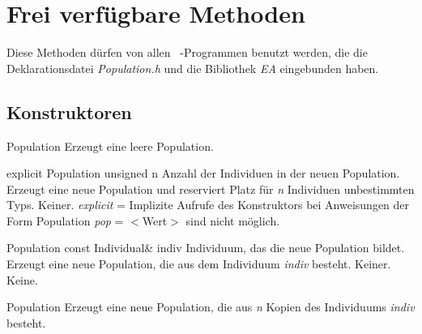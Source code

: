 \documentclass{report}
\begin{document}
\section{Frei verf\"ugbare Methoden}
Diese Methoden d\"urfen von allen \cpp\ -Programmen benutzt werden, die
die Deklarationsdatei {\em Population.h} und
die Bibliothek {\em EA} eingebunden haben.


\subsection{Konstruktoren}

\setNormalInstance
\printEmptyMethod
{Population}
{Erzeugt eine leere Population.}

\vspace{4ex}

\setNormalInstance
\printMethodWithOneParam
{explicit}
{Population}
{unsigned}
{n}
{Anzahl der Individuen in der neuen Population.}
{Erzeugt eine neue Population und reserviert Platz
    f\"ur {\em n} Individuen unbestimmten Typs.}
{Keiner.}
{{\em explicit} = Implizite Aufrufe des Konstruktors bei Anweisungen
                    der Form Population {\em pop} = $<$Wert$>$ sind nicht m\"oglich.}

\newpage

\setNormalInstance
\printMethodWithOneParam
{}
{Population}
{const Individual\&}
{indiv}
{Individuum, das die neue Population bildet.}
{Erzeugt eine neue Population, die aus dem Individuum
    {\em indiv} besteht.}
{Keiner.}
{Keine.}

\vspace{4ex}

\setNormalInstance
\setCorrectWidthThree{8pt}
\printMethodWithParamsSaved
{}
{}
{Population}
{Erzeugt eine neue Population, die aus {\em n} Kopien des
    Individuums {\em indiv} besteht.}
{}
\setCorrectWidthThree{4pt}
\end{document}
